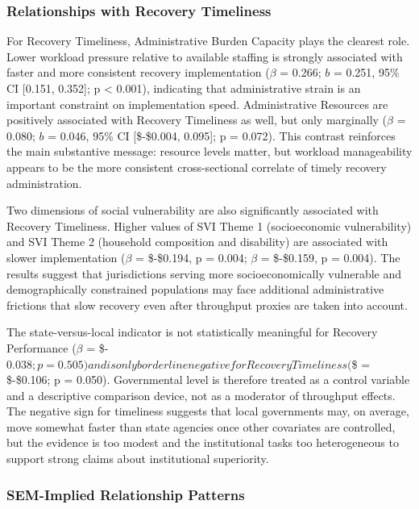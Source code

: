 \documentclass[
  number]{elsarticle}
\begin{document}
\subsubsection{Relationships with Recovery
Timeliness}\label{relationships-with-recovery-timeliness}

For Recovery Timeliness, Administrative Burden Capacity plays the
clearest role. Lower workload pressure relative to available staffing is
strongly associated with faster and more consistent recovery
implementation (\(\beta\) = 0.266; \(b\) = 0.251, 95\% CI {[}0.151,
0.352{]}; p \textless{} 0.001), indicating that administrative strain is
an important constraint on implementation speed. Administrative
Resources are positively associated with Recovery Timeliness as well,
but only marginally (\(\beta\) = 0.080; \(b\) = 0.046, 95\% CI
{[}\$-\$0.004, 0.095{]}; p = 0.072). This contrast reinforces the main
substantive message: resource levels matter, but workload manageability
appears to be the more consistent cross-sectional correlate of timely
recovery administration.

Two dimensions of social vulnerability are also significantly associated
with Recovery Timeliness. Higher values of SVI Theme 1 (socioeconomic
vulnerability) and SVI Theme 2 (household composition and disability)
are associated with slower implementation (\(\beta\) = \$-\$0.194, p =
0.004; \(\beta\) = \$-\$0.159, p = 0.004). The results suggest that
jurisdictions serving more socioeconomically vulnerable and
demographically constrained populations may face additional
administrative frictions that slow recovery even after throughput
proxies are taken into account.

The state-versus-local indicator is not statistically meaningful for
Recovery Performance (\(\beta\) =
\$-\(0.038; p = 0.505) and is only borderline negative for Recovery Timeliness (\)\beta\$
= \$-\$0.106; p = 0.050). Governmental level is therefore treated as a
control variable and a descriptive comparison device, not as a moderator
of throughput effects. The negative sign for timeliness suggests that
local governments may, on average, move somewhat faster than state
agencies once other covariates are controlled, but the evidence is too
modest and the institutional tasks too heterogeneous to support strong
claims about institutional superiority.

\subsubsection{SEM-Implied Relationship
Patterns}\label{sem-implied-relationship-patterns}
\end{document}
